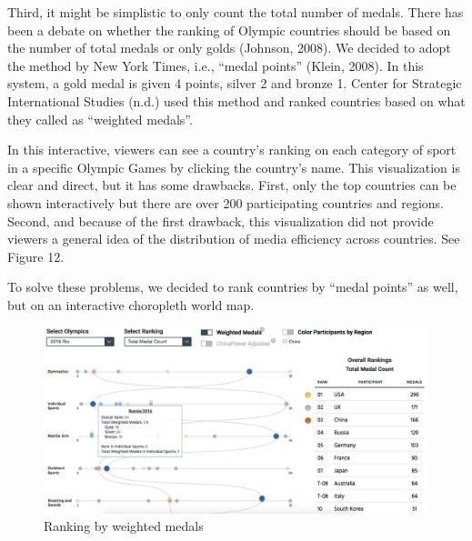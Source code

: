 \documentclass[12pt]{article}
\begin{document}
Third, it might be simplistic to only count the total number of medals. There has been a debate on whether the ranking of Olympic countries should be based on the number of total medals or only golds (Johnson, 2008). We decided to adopt the method by New York Times, i.e., “medal points” (Klein, 2008). In this system, a gold medal is given 4 points, silver 2 and bronze 1. Center for Strategic International Studies (n.d.) used this method and ranked countries based on what they called as “weighted medals”. 

In this interactive, viewers can see a country’s ranking on each category of sport in a specific Olympic Games by clicking the country’s name. This visualization is clear and direct, but it has some drawbacks. First, only the top countries can be shown interactively but there are over 200 participating countries and regions. Second, and because of the first drawback, this visualization did not provide viewers a general idea of the distribution of media efficiency across countries. See Figure 12.

To solve these problems, we decided to rank countries by “medal points” as well, but on an interactive choropleth world map. 

\begin{figure}[!t]
    \centering
    \includegraphics[scale=0.35]{pics/3-7.png}
    \caption{Ranking by weighted medals}
    \label{fig:my_label}
\end{figure}
\end{document}
